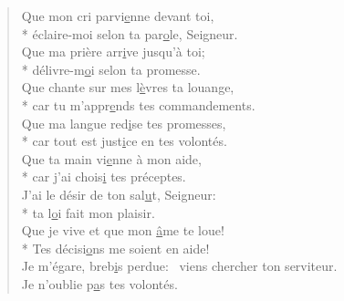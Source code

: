 \begin{verse}
Que mon cri parvi\underline{e}nne devant toi, \\*
éclaire-moi selon ta par\underline{o}le, Seigneur. \\
Que ma prière arr\underline{i}ve jusqu’à toi; \\*
délivre-m\underline{o}i selon ta promesse. \\
Que chante sur mes l\underline{è}vres ta louange, \\*
car tu m’appr\underline{e}nds tes commandements. \\
Que ma langue red\underline{i}se tes promesses, \\*
car tout est just\underline{i}ce en tes volontés. \\
Que ta main vi\underline{e}nne à mon aide, \\*
car j’ai chois\underline{i} tes préceptes. \\
J’ai le désir de ton sal\underline{u}t, Seigneur: \\*
ta l\underline{o}i fait mon plaisir. \\
Que je vive et que mon \underline{â}me te loue! \\*
Tes décisi\underline{o}ns me soient en aide! \\
Je m’égare, breb\underline{i}s perdue:~\psalmstar
viens chercher ton serviteur. \\
Je n’oublie p\underline{a}s tes volontés. \\
\end{verse}

